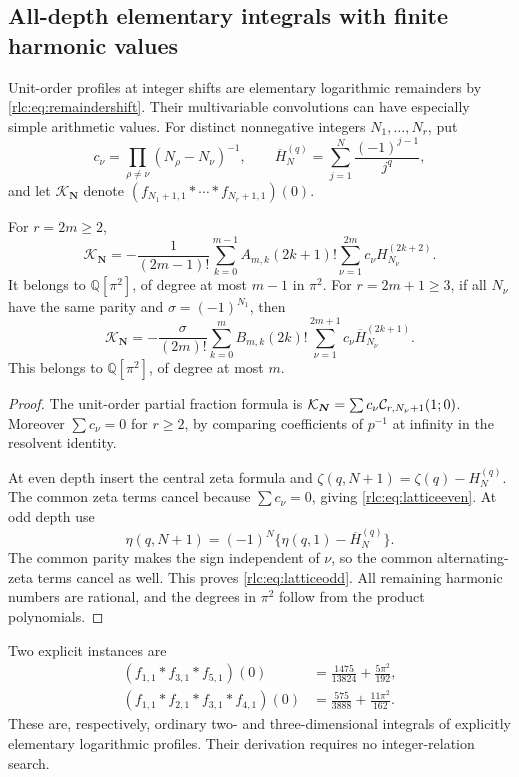 \subsection{All-depth elementary integrals with finite harmonic values}
Unit-order profiles at integer shifts are elementary logarithmic
remainders by \eqref{rlc:eq:remaindershift}. Their multivariable
convolutions can have especially simple arithmetic values.
For distinct nonnegative integers $N_1,\ldots,N_r$, put
\[
 c_\nu=\prod_{\rho\ne\nu}(N_\rho-N_\nu)^{-1},\qquad
 \overline H_N^{(q)}=\sum_{j=1}^N\frac{(-1)^{j-1}}{j^q},
\]
and let $\mathcal K_{\boldsymbol N}$ denote
$(f_{N_1+1,1}*\cdots*f_{N_r+1,1})(0)$.

\begin{theorem}
\label{rlc:thm:lattice}
For $r=2m\ge2$,
\begin{equation}\label{rlc:eq:latticeeven}
 \mathcal K_{\boldsymbol N}
 =-\frac1{(2m-1)!}\sum_{k=0}^{m-1}A_{m,k}(2k+1)!
          \sum_{\nu=1}^{2m}c_\nu H_{N_\nu}^{(2k+2)}.
\end{equation}
It belongs to $\mathbb Q[\pi^2]$, of degree at most $m-1$ in $\pi^2$.
For $r=2m+1\ge3$, if all $N_\nu$ have the same parity and
$\sigma=(-1)^{N_1}$, then
\begin{equation}\label{rlc:eq:latticeodd}
 \mathcal K_{\boldsymbol N}
 =-\frac{\sigma}{(2m)!}\sum_{k=0}^{m}B_{m,k}(2k)!
          \sum_{\nu=1}^{2m+1}c_\nu\overline H_{N_\nu}^{(2k+1)}.
\end{equation}
This belongs to $\mathbb Q[\pi^2]$, of degree at most $m$.
\end{theorem}
\begin{proof}
The unit-order partial fraction formula is
$\mathcal K_{\boldsymbol N}=\sum c_\nu\mathcal C_{r,N_\nu+1}(1;0)$.
Moreover $\sum c_\nu=0$ for $r\ge2$, by comparing coefficients of
$p^{-1}$ at infinity in the resolvent identity.

At even depth insert the central zeta formula and
$\zeta(q,N+1)=\zeta(q)-H_N^{(q)}$. The common zeta terms cancel because
$\sum c_\nu=0$, giving \eqref{rlc:eq:latticeeven}.
At odd depth use
\[
 \eta(q,N+1)=(-1)^N\{\eta(q,1)-\overline H_N^{(q)}\}.
\]
The common parity makes the sign independent of $\nu$, so the common
alternating-zeta terms cancel as well. This proves
\eqref{rlc:eq:latticeodd}. All remaining harmonic numbers are rational,
and the degrees in $\pi^2$ follow from the product polynomials.
\end{proof}

Two explicit instances are
\begin{align}
 (f_{1,1}*f_{3,1}*f_{5,1})(0)
       &=\frac{1475}{13824}+\frac{5\pi^2}{192},
       \label{rlc:eq:lattice3}\\
 (f_{1,1}*f_{2,1}*f_{3,1}*f_{4,1})(0)
       &=\frac{575}{3888}+\frac{11\pi^2}{162}.
       \label{rlc:eq:lattice4}
\end{align}
These are, respectively, ordinary two- and three-dimensional integrals
of explicitly elementary logarithmic profiles. Their derivation requires
no integer-relation search.

